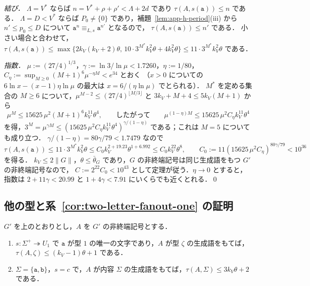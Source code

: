 \emph{結び．}
$\Lambda=V^*$ ならば $n=V^*+\rho+\rho'<\Lambda+2d$ であり $\tau(A,s(\mathtt a))\le n$ である．
$\Lambda=D<V^*$ ならば $P_0\ne\{0\}$ であり，補題~\ref{lem:app-h-period}(iii) から $n'\le p_0\le D$ について $\mathtt a^n\equiv_{L,s}\mathtt a^{n'}$ となるので，
$\tau(A,s(\mathtt a))\le n'$ である．
小さい場合と合わせて，$\tau(A,s(\mathtt a))\le\max\{2k_V(k_V+2)\theta,\,10\cdot3^{M^*}k_V^2\theta+4k_V^2\theta\}\le11\cdot3^{M^*}k_V^2\theta$ である．

\emph{指数．}
$\mu:=(27/4)^{1/3}$，$\gamma:=\ln3/\ln\mu<1.7260$，$\eta:=1/80$，$C_\eta:=\sup_{M\ge0}(M+1)^6\mu^{-\eta M}<e^{34}$ とおく
（$x>0$ についての $6\ln x-(x-1)\eta\ln\mu$ の最大は $x=6/(\eta\ln\mu)$ でとられる）．
$M^*$ を定める集合の $M\ge6$ について，$\mu^{M-2}\le(27/4)^{\lfloor M/3\rfloor}$ と $3k_V+M+4\le5k_V(M+1)$ から
\[
 \mu^M\le15625\,\mu^2(M+1)^6k_V^{11}\theta^4,\qquad\text{したがって}\qquad
 \mu^{(1-\eta)M}\le15625\,\mu^2C_\eta k_V^{11}\theta^4
\]
を得，$3^M=\mu^{\gamma M}\le(15625\,\mu^2C_\eta k_V^{11}\theta^4)^{\gamma/(1-\eta)}$ である；これは $M=5$ についても成り立つ．
$\gamma/(1-\eta)=80\gamma/79<1.7479$ なので
\[
 \tau(A,s(\mathtt a))\le11\cdot3^{M^*}k_V^2\theta\le C_0k_V^{2+19.23}\theta^{1+6.992}
 \le C_0k_V^{22}\theta^8,\qquad C_0:=11(15625\,\mu^2C_\eta)^{80\gamma/79}<10^{36}
\]
を得る．
$k_V\le2\|G\|$，$\theta\le\bar\theta_G$ であり，$G$ の非終端記号は同じ生成語をもつ $G'$ の非終端記号なので，
$C:=2^{22}C_0<10^{43}$ として定理が従う．$\eta\to0$ とすると，指数は $2+11\gamma<20.99$ と $1+4\gamma<7.91$ にいくらでも近くとれる．\qed

\subsection{他の型と系~\ref{cor:two-letter-fanout-one} の証明}

\begin{lemma}
\label{lem:app-h-other}
$G'$ を上のとおりとし，$A$ を $G'$ の非終端記号とする．
\begin{enumerate}[label=\textup{(\roman*)},leftmargin=*]
\item $s:\Sigma^+\twoheadrightarrow U_1$ で $\mathtt a$ が型 $1$ の唯一の文字であり，$A$ が型 $\zeta$ の生成語をもてば，
$\tau(A,\zeta)\le(k_V-1)\theta+1$ である．
\item $\Sigma=\{\mathtt a,\mathtt b\}$，$s=c$ で，$A$ が内容 $\Sigma$ の生成語をもてば，$\tau(A,\Sigma)\le3k_V\theta+2$ である．
\end{enumerate}
\end{lemma}

